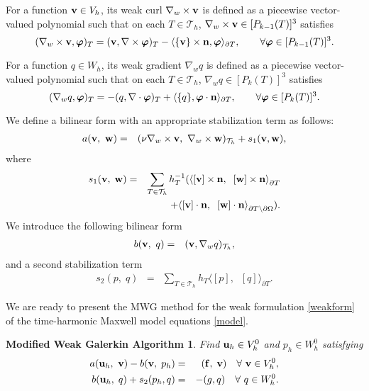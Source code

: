 \documentclass[11pt]{amsart}
\newtheorem{algorithm}{Modified Weak Galerkin Algorithm}
\newcommand{\bu}{{\bf u}}
\newcommand{\bw}{{\bf w}}
\newcommand{\bv}{{\bf v}}
\def\bvarphi{{\boldsymbol{\varphi}}}
\def\T{{\mathcal T}}
\def\pT{{\partial T}}
\def\l{{\langle}}
\def\r{{\rangle}}
\def\bn{{\bf n}}
\def\cal#1{\mathcal{#1}}
\begin{document}
For a function $\bv\in V_h$, its  weak curl $\nabla_w\times\bv$ is defined as a piecewise vector-valued polynomial such that on each $T\in\T_h$, $\nabla_w\times\bv \in [P_{k-1}(T)]^3$   satisfies  
\begin{equation}\label{d-c}
  (\nabla_w\times\bv, \bvarphi)_T = (\bv, \nabla\times\bvarphi)_T
 -\langle \{\bv\}\times\bn, \bvarphi\rangle_{\partial T},\qquad
   \forall \bvarphi\in [P_{k-1}(T)]^3.
\end{equation}

For a function $q\in W_h$, its  weak gradient $\nabla_w q$  is defined as a piecewise vector-valued polynomial such that on each $T\in\T_h$, $\nabla_w q \in [P_k(T)]^3$  satisfies  
\begin{equation}\label{d-g}
  (\nabla_w q, \bvarphi)_T = -(q, \nabla\cdot\bvarphi)_T
 + \langle \{ q\}, \bvarphi\cdot\bn\rangle_{\partial T},\qquad
   \forall \bvarphi\in [P_k(T)]^3.
\end{equation}

We define a bilinear form with an appropriate
stabilization term as follows:
\begin{eqnarray}\label{Stabilized-A-form}
a(\bv,\ \bw)&=&(\nu\nabla_w\times\bv,\
\nabla_w\times\bw)_{{\cal T}_h}+s_1(\bv,\bw),
\end{eqnarray}
where
\begin{eqnarray}\label{Stabilization-T1}
s_1(\bv,\;\bw) &=& \sum_{T\in {\cal T}_h}h^{-1}_T (\l [\bv]\times\bn,\;\;[\bw]\times\bn\r_\pT
   \\ & & \quad \nonumber +\l
[\bv]\cdot\bn,\;\;[\bw]\cdot\bn\r_{\pT\setminus {\partial\Omega}}).
\end{eqnarray}
We introduce the following bilinear form
\begin{eqnarray}\label{B-form}
b(\bv,\ q)&=&(\bv,\nabla_w q)_{{\cal T}_h},
\end{eqnarray}
and a second stabilization term
\begin{eqnarray}\label{Stabilization-T2}
s_2(p,\;q) & = & \sum_{T\in {\cal T}_h}h_T\l
[p],\;\;[q]\r_\pT.
\end{eqnarray}

We are ready to present the MWG method  for the weak formulation \eqref{weakform} of the time-harmonic Maxwell model equations \eqref{model}.
\begin{algorithm}
Find $\bu_h\in V_h^0$  and
$p_h\in W_h^0$ satisfying
\begin{eqnarray}
a(\bu_h,\ \bv)-b(\bv,\;p_h)&=&({\bf f},\;\bv)\quad\forall\ \bv\in
V_{h}^0,\label{wg1}\\
b(\bu_h,\;q)+s_2(p_h,q)&=&-(g,q) \quad\forall\ q\in W_h^0.\label{wg2}
\end{eqnarray}
\end{algorithm}
\smallskip
\end{document}
